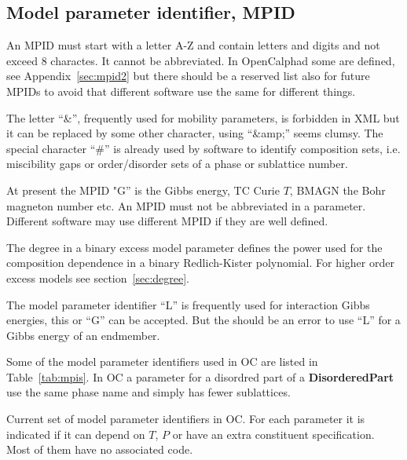 \documentclass{article}
\begin{document}
\begin{appendices}
{\begin{verbatim}
\end{verbatim}
}

\subsection{Model parameter identifier, MPID}\label{sec:mpid}\label{sec:mpid2}

An MPID must start with a letter A-Z and contain letters and digits
and not exceed 8 charactes.  It cannot be abbreviated.  In
OpenCalphad some are defined, see Appendix~\ref{sec:mpid2} but there
should be a reserved list also for future MPIDs to avoid that
different software use the same for different things.
  
The letter ``\&'', frequently used for mobility parameters, is
forbidden in XML but it can be replaced by some other character, using
``\&amp;'' seems clumsy.  The special character ``\#'' is already used
by software to identify composition sets, i.e. miscibility gaps or
order/disorder sets of a phase or sublattice number.

At present the MPID "G'' is the Gibbs energy, TC Curie $T$, BMAGN the
Bohr magneton number etc.  An MPID must not be abbreviated in a
parameter.  Different software may use different MPID if they are well
defined.

The degree in a binary excess model parameter defines the power used
for the composition dependence in a binary Redlich-Kister polynomial.
For higher order excess models see section~\ref{sec:degree}.

The model parameter identifier ``L'' is frequently used for
interaction Gibbs energies, this or ``G'' can be accepted.  But the
should be an error to use ``L'' for a Gibbs energy of an endmember.

Some of the model parameter identifiers used in OC are listed in
Table~\ref{tab:mpis}.  In OC a parameter for a disordred part of a
{\bf DisorderedPart} use the same phase name and simply has fewer
sublattices.

\begin{table}[!h]
  \caption{Current set of model parameter identifiers in OC.  For each
    parameter it is indicated if it can depend on $T$, $P$ or have an
    extra constituent specification.  Most of them have no associated
    code.}\label{tab:mpis}


\end{table}
\end{appendices}
\end{document}
